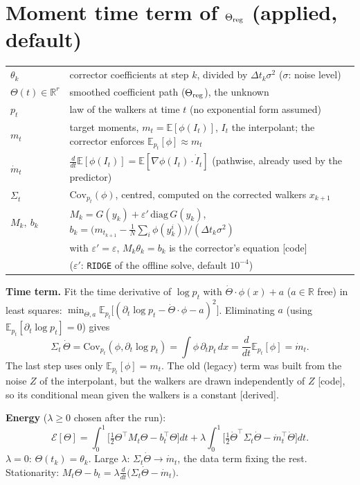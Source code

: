 \documentclass[11pt,a4paper]{article}
\newcommand{\E}{\mathbb{E}}
\begin{document}
\section{Moment time term of $\Theta_{\rm reg}$ \hfill\small(applied, default)}
\begin{tabular}{@{}lp{}@{}}
$\theta_k$ & corrector coefficients at step $k$, divided by $\Delta t_k\sigma^2$ ($\sigma$: noise level)\\
$\Theta(t)\in\mathbb R^r$ & smoothed coefficient path ($\Theta_{\rm reg}$), the unknown\\
$p_t$ & law of the walkers at time $t$ (no exponential form assumed)\\
$m_t$ & target moments, $m_t=\E[\phi(I_t)]$, $I_t$ the interpolant; the corrector enforces $\E_{p_t}[\phi]\approx m_t$\\
$\dot m_t$ & $\frac{d}{dt}\E[\phi(I_t)]=\E[\nabla\phi(I_t)\cdot\dot I_t]$ (pathwise, already used by the predictor)\\
$\Sigma_t$ & $\mathrm{Cov}_{p_t}(\phi)$, centred, computed on the corrected walkers $x_{k+1}$\\
$M_k,\ b_k$ & $M_k=G(y_k)+\varepsilon'\,\mathrm{diag}\,G(y_k)$, $b_k=\big(m_{t_{k+1}}-\tfrac1N\sum_i\phi(y^i_k)\big)/(\Delta t_k\sigma^2)$\\
& with $\varepsilon'=\varepsilon$, $M_k\theta_k=b_k$ is the corrector's equation [code]\\
& ($\varepsilon'$: \texttt{RIDGE} of the offline solve, default $10^{-4}$)\\
\end{tabular}

\textbf{Time term.} Fit the time derivative of $\log p_t$ with $\dot\Theta\cdot\phi(x)+a$ ($a\in\mathbb R$ free)
in least squares: $\min_{\dot\Theta,a}\E_{p_t}\big[(\partial_t\log p_t-\dot\Theta\cdot\phi-a)^2\big]$.
Eliminating $a$ (using $\E_{p_t}[\partial_t\log p_t]=0$) gives
\[
\Sigma_t\,\dot\Theta=\mathrm{Cov}_{p_t}(\phi,\partial_t\log p_t)=\int\phi\,\partial_tp_t\,dx
=\frac{d}{dt}\E_{p_t}[\phi]=\dot m_t .
\]
The last step uses only $\E_{p_t}[\phi]=m_t$. The old (legacy) term was built from the noise $Z$ of
the interpolant, but the walkers are drawn independently of $Z$ [code], so its conditional mean
given the walkers is a constant [derived].

\textbf{Energy} ($\lambda\ge0$ chosen after the run):
\[
\mathcal E[\Theta]=\int_0^1\Big[\tfrac12\Theta^\top M_t\Theta-b_t^\top\Theta\Big]dt
+\lambda\int_0^1\Big[\tfrac12\dot\Theta^\top\Sigma_t\dot\Theta-\dot m_t^\top\dot\Theta\Big]dt .
\]
$\lambda=0$: $\Theta(t_k)=\theta_k$. Large $\lambda$: $\Sigma_t\dot\Theta\to\dot m_t$, the data term fixing the rest.
Stationarity: $M_t\Theta-b_t=\lambda\frac{d}{dt}\big(\Sigma_t\dot\Theta-\dot m_t\big)$.
\end{document}
